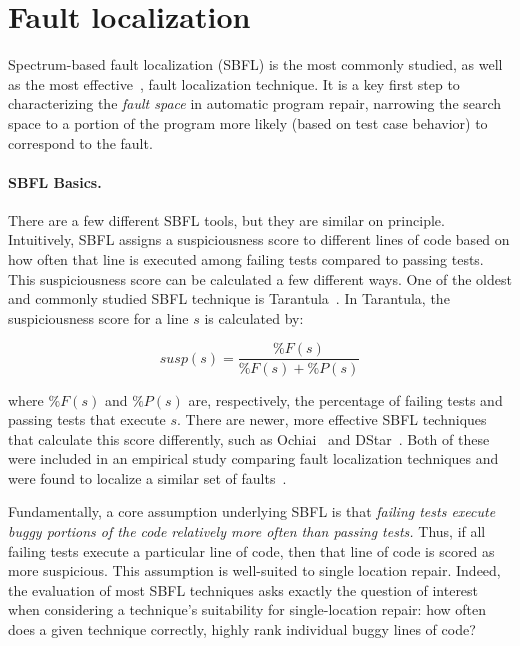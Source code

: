 \section{Fault localization} \label{secFL}



Spectrum-based fault localization (SBFL) is the most commonly studied, as well as the most 
effective~\cite{zou2019empirical}, fault localization technique. It is a key
first step to characterizing the \emph{fault space} in automatic program repair,
narrowing the search space to a portion of the program more likely (based on
test case behavior) to correspond to the fault.  

\paragraph{SBFL Basics.} 
There are a few different SBFL tools, but they are 
similar on principle. Intuitively, SBFL assigns a suspiciousness score to different lines of 
code based on how often that line is executed among failing tests compared to passing 
tests. This suspiciousness score can be calculated a few different ways. One of the oldest 
and commonly studied SBFL technique is Tarantula~\cite{tarantula}. In Tarantula, the 
suspiciousness score for a line $s$ is calculated by:

$$\mathit{susp(s)} 
=\frac{\mathit{\%F(s)}}{\mathit{\%F(s)} + \mathit{\%P(s)}}$$

where  $\mathit{\%F(s)}$ and $\mathit{\%P(s)}$ are, respectively, the percentage of failing 
tests and passing tests that execute $s$. There are newer, more effective 
SBFL techniques that calculate this score differently, such as Ochiai~\cite{ochiai} and 
DStar~\cite{wong2013dstar}. Both of these were included in an empirical study 
comparing fault localization techniques and were found to localize a similar set of 
faults~\cite{zou2019empirical}.
  

Fundamentally, a core assumption underlying SBFL is that \emph{failing tests execute 
buggy portions of the code relatively more often than passing tests.} 
Thus, if all failing tests execute a 
particular line of code, then that line of code is scored as more suspicious.
This assumption is well-suited to single location repair. Indeed, the evaluation
of most SBFL techniques asks exactly the question of interest when considering a
technique's suitability for single-location repair: how often does a given technique
correctly, highly rank individual buggy lines of code? 

